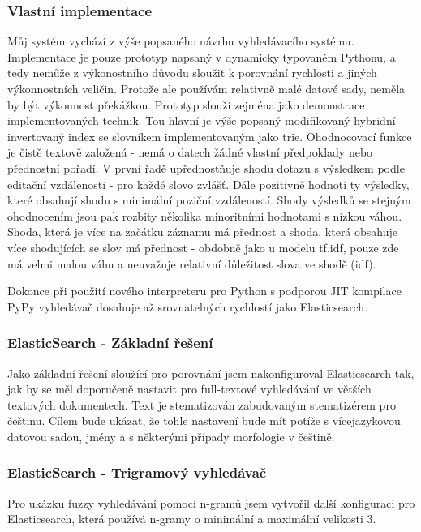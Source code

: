 \documentclass[11pt,letterpaper,oneside,openright]{book}
\begin{document}
\subsubsection{Vlastní implementace}
Můj systém vychází z výše popsaného návrhu vyhledávacího systému. Implementace
je pouze prototyp napsaný v dynamicky typovaném Pythonu, a tedy nemůže z
výkonostního důvodu sloužit k porovnání rychlosti a jiných výkonnostních
veličin. Protože ale používám relativně malé datové sady, neměla by být
výkonnost překážkou. Prototyp slouží zejména jako demonstrace implementovaných
technik. Tou hlavní je výše popsaný modifikovaný hybridní invertovaný index se
slovníkem implementovaným jako trie.  Ohodnocovací funkce je čistě textově
založená - nemá o datech žádné vlastní předpoklady nebo přednostní pořadí. V
první řadě upřednostňuje shodu dotazu s výsledkem podle editační vzdálenosti -
pro každé slovo zvlášť. Dále pozitivně hodnotí ty výsledky, které obsahují
shodu s minimální poziční vzdáleností.  Shody výsledků se stejným ohodnocením
jsou pak rozbity několika minoritními hodnotami s nízkou váhou. Shoda, která je
více na začátku záznamu má přednost a shoda, která obsahuje více shodujících se
slov má přednost - obdobně jako u modelu tf.idf, pouze zde má velmi malou váhu
a neuvažuje relativní důležitost slova ve shodě (idf).

Dokonce při použití nového interpreteru pro Python s podporou JIT
kompilace PyPy vyhledávač dosahuje až srovnatelných rychlostí jako
Elasticsearch.


\subsubsection{ElasticSearch - Základní řešení}
Jako základní řešení sloužící pro porovnání jsem nakonfiguroval Elasticsearch
tak, jak by se měl doporučeně nastavit pro full-textové vyhledávání ve větších
textových dokumentech. Text je stematizován zabudovaným stematizérem pro
češtinu. Cílem bude ukázat, že tohle nastavení bude mít potíže s vícejazykovou
datovou sadou, jmény a s některými případy morfologie v češtině.

\subsubsection{ElasticSearch - Trigramový vyhledávač} \label{sec:trigram_implementation}
Pro ukázku fuzzy vyhledávání pomocí n-gramů jsem vytvořil další konfiguraci pro
Elasticsearch, která používá n-gramy o minimální a maximální velikosti 3.
\end{document}
